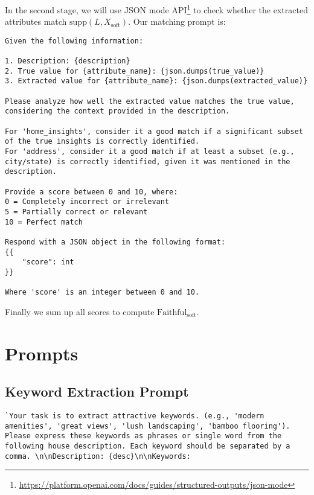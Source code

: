 In the second stage, we will use JSON mode API\footnote{\url{https://platform.openai.com/docs/guides/structured-outputs/json-mode}} to check whether the extracted attributes match $\text{supp}(L, X_{\text{soft}})$. Our matching prompt is:
\begin{lstlisting}
Given the following information:

1. Description: {description}
2. True value for {attribute_name}: {json.dumps(true_value)}
3. Extracted value for {attribute_name}: {json.dumps(extracted_value)}

Please analyze how well the extracted value matches the true value, considering the context provided in the description.

For 'home_insights', consider it a good match if a significant subset of the true insights is correctly identified.
For 'address', consider it a good match if at least a subset (e.g., city/state) is correctly identified, given it was mentioned in the description.

Provide a score between 0 and 10, where:
0 = Completely incorrect or irrelevant
5 = Partially correct or relevant
10 = Perfect match

Respond with a JSON object in the following format:
{{
    "score": int
}}

Where 'score' is an integer between 0 and 10.    
\end{lstlisting}
Finally we sum up all scores to compute $\text{Faithful}_\text{soft}$.

\section{Prompts}
\subsection{Keyword Extraction Prompt}
\label{app: keyword_extraction_prompt}%
    \begin{lstlisting}
`Your task is to extract attractive keywords. (e.g., 'modern amenities', 'great views', 'lush landscaping', 'bamboo flooring'). Please express these keywords as phrases or single word from the following house description. Each keyword should be separated by a comma. \n\nDescription: {desc}\n\nKeywords: 
\end{lstlisting}
